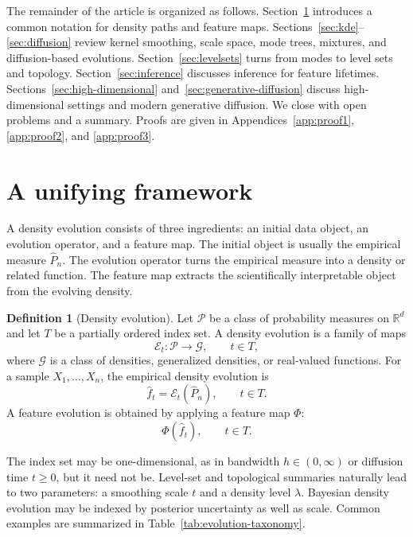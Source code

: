 \documentclass[preprint]{imsart}
\theoremstyle{plain}
\theoremstyle{definition}
\newtheorem{definition}[theorem]{Definition}
\newcommand{\R}{\mathbb{R}}
\newcommand{\Emp}{\widehat P_n}
\newcommand{\fhat}{\widehat f}
\newcommand{\calE}{\mathcal{E}}
\begin{document}
The remainder of the article is organized as follows. Section~\ref{sec:framework}
introduces a common notation for density paths and feature maps.
Sections~\ref{sec:kde}--\ref{sec:diffusion} review kernel smoothing,
scale space, mode trees, mixtures, and diffusion-based evolutions.
Section~\ref{sec:levelsets} turns from modes to level sets and topology.
Section~\ref{sec:inference} discusses inference for feature lifetimes.
Sections~\ref{sec:high-dimensional} and~\ref{sec:generative-diffusion}
discuss high-dimensional settings and modern generative diffusion.
We close with open problems and a summary. Proofs are given in Appendices~\ref{app:proof1}, \ref{app:proof2}, and \ref{app:proof3}.

\section{A unifying framework}\label{sec:framework}

A density evolution consists of three ingredients: an initial data object, an evolution operator, and a feature map. The initial object is usually the empirical measure $\Emp$. The evolution operator turns the empirical measure into a density or related function. The feature map extracts the scientifically interpretable object from the evolving density.

\begin{definition}[Density evolution]
Let $\mathcal P$ be a class of probability measures on $\R^d$ and let $T$ be a partially ordered index set. A density evolution is a family of maps
\[
  \calE_t:\mathcal P\to \mathcal G,
  \qquad t\in T,
\]
where $\mathcal G$ is a class of densities, generalized densities, or real-valued functions. For a sample $X_1,\ldots,X_n$, the empirical density evolution is
\[
  \fhat_t = \calE_t(\Emp),\qquad t\in T.
\]
A feature evolution is obtained by applying a feature map $\Phi$:
\[
  \Phi(\fhat_t),\qquad t\in T.
\]
\end{definition}

The index set may be one-dimensional, as in bandwidth $h\in(0,\infty)$ or diffusion time $t\ge 0$, but it need not be. Level-set and topological summaries naturally lead to two parameters: a smoothing scale $t$ and a density level $\lambda$. Bayesian density evolution may be indexed by posterior uncertainty as well as scale. Common examples are summarized in Table~\ref{tab:evolution-taxonomy}.
\end{document}
